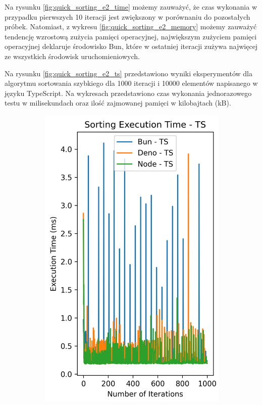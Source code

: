 Na rysunku \ref{fig:quick_sorting_e2_time} możemy zauważyć, że czas wykonania w przypadku pierwszych 10 iteracji jest zwiększony w porównaniu do pozostałych próbek. Natomiast, z wykresu \ref{fig:quick_sorting_e2_memory} możemy zauważyć tendencję wzrostową zużycia pamięci operacyjnej, największym zużyciem pamięci operacyjnej deklaruje środowisko Bun, które w ostatniej iteracji zużywa najwięcej ze wszystkich środowisk uruchomieniowych.

Na rysunku \ref{fig:quick_sorting_e2_ts} przedstawiono wyniki eksperymentów dla algorytmu sortowania szybkiego dla 1000 iteracji i 10000 elementów napisanego w języku TypeScript. Na wykresach przedstawiono czas wykonania jednorazowego testu w milisekundach oraz ilość zajmowanej pamięci w kilobajtach (kB).

\begin{figure}[H]
  \centering
  \begin{subfigure}[b]{0.42\textwidth}
    \centering
    \includegraphics[width=\textwidth]{Figures/sorting/sorting_quick_1000_1000_ts_time.png}

\end{subfigure}
\end{figure}
